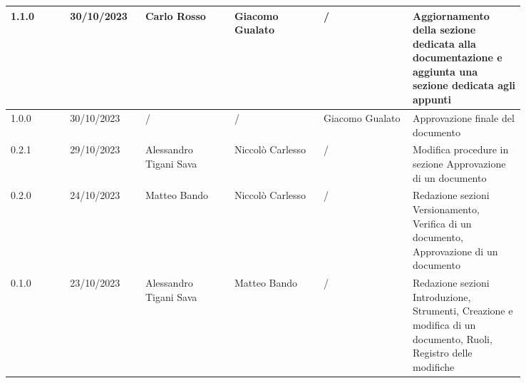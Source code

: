 {\begin{longtable}{p{0.10\linewidth}p{0.10\linewidth}p{0.15\linewidth}p{0.15\linewidth}p{0.15\linewidth}p{0.19\linewidth}}
	  \hline
	  1.1.0	& 30/10/2023    & Carlo Rosso            & Giacomo Gualato	& /					& Aggiornamento della sezione dedicata alla documentazione e aggiunta una sezione dedicata agli appunti	\\
	  \hline
	  1.0.0	& 30/10/2023    & /                      & /				& Giacomo Gualato	& Approvazione finale del documento \\
	  \hline
	  0.2.1	& 29/10/2023    & Alessandro Tigani Sava & Niccolò Carlesso	& /					& Modifica procedure in sezione Approvazione di un documento	\\
	  \hline
	  0.2.0	& 24/10/2023    & Matteo Bando           & Niccolò Carlesso	& /					& Redazione sezioni Versionamento, Verifica di un documento, Approvazione di un documento	\\
	  \hline
	  0.1.0	& 23/10/2023    & Alessandro Tigani Sava & Matteo Bando		& /					& Redazione sezioni Introduzione, Strumenti, Creazione e modifica di un documento, Ruoli, Registro delle modifiche	\\
	  \hline
  \end{longtable}
 }
